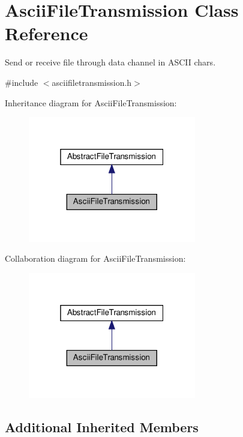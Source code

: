 \hypertarget{classAsciiFileTransmission}{}\section{Ascii\+File\+Transmission Class Reference}
\label{classAsciiFileTransmission}


Send or receive file through data channel in A\+S\+C\+II chars.  




{\ttfamily \#include $<$asciifiletransmission.\+h$>$}



Inheritance diagram for Ascii\+File\+Transmission\+:\nopagebreak
\begin{figure}[H]
\begin{center}
\leavevmode
\includegraphics[width=208pt]{d8/d5c/classAsciiFileTransmission__inherit__graph}
\end{center}
\end{figure}


Collaboration diagram for Ascii\+File\+Transmission\+:\nopagebreak
\begin{figure}[H]
\begin{center}
\leavevmode
\includegraphics[width=208pt]{d9/dfb/classAsciiFileTransmission__coll__graph}
\end{center}
\end{figure}
\subsection*{Additional Inherited Members}


